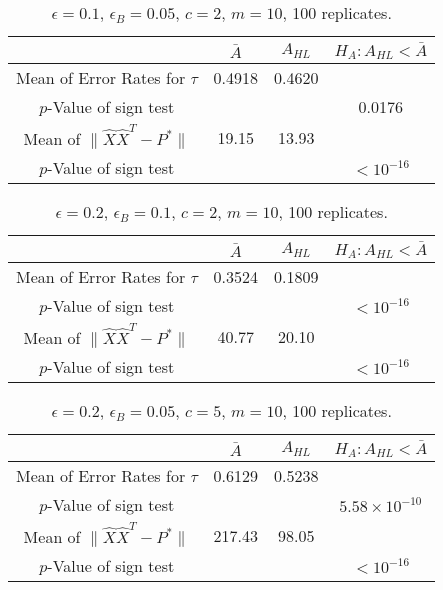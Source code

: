 \documentclass[a4paper]{article}
\begin{document}
\begin{table}
\centering
\begin{tabular}{c|c|c|c}
& $\bar{A}$ & $A_{HL}$ & $H_A: A_{HL} < \bar{A}$ \\\hline
Mean of Error Rates for $\widehat{\tau}$ & 0.4918 & 0.4620 & \\
$p$-Value of sign test & & & 0.0176 \\\hline
Mean of $\|\hat{X}\hat{X}^T - P^*\|$ & 19.15 & 13.93 & \\
$p$-Value of sign test & & & $ < 10^{-16}$\\
\end{tabular}
\caption{\label{tab:result1}$\epsilon = 0.1$, $\epsilon_B = 0.05$, $c = 2$, $m = 10$, 100 replicates.}
\end{table}

\begin{table}
\centering
\begin{tabular}{c|c|c|c}
& $\bar{A}$ & $A_{HL}$ & $H_A: A_{HL} < \bar{A}$ \\\hline
Mean of Error Rates for $\widehat{\tau}$ & 0.3524 & 0.1809 & \\
$p$-Value of sign test & & & $< 10^{-16}$ \\\hline
Mean of $\|\hat{X}\hat{X}^T - P^*\|$ & 40.77 & 20.10 & \\
$p$-Value of sign test & & & $ < 10^{-16}$\\
\end{tabular}
\caption{\label{tab:result2}$\epsilon = 0.2$, $\epsilon_B = 0.1$, $c = 2$, $m = 10$, 100 replicates.}
\end{table}

\begin{table}
\centering
\begin{tabular}{c|c|c|c}
& $\bar{A}$ & $A_{HL}$ & $H_A: A_{HL} < \bar{A}$ \\\hline
Mean of Error Rates for $\widehat{\tau}$ & 0.6129 & 0.5238 & \\
$p$-Value of sign test & & & $5.58 \times 10^{-10}$ \\\hline
Mean of $\|\hat{X}\hat{X}^T - P^*\|$ & 217.43 & 98.05 & \\
$p$-Value of sign test & & & $ < 10^{-16}$\\
\end{tabular}
\caption{\label{tab:result3}$\epsilon = 0.2$, $\epsilon_B = 0.05$, $c = 5$, $m = 10$, 100 replicates.}
\end{table}
\end{document}
